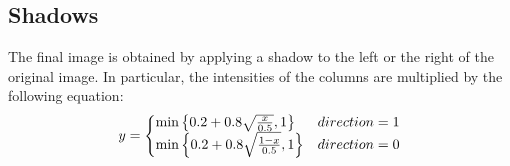 \subsection{Shadows}
The final image is obtained by applying a shadow  to the left or the right of the original image. In particular, the intensities of the columns are multiplied by the following equation:
\[
y =
\left\{
\begin{array}{
  @{}%
  l@{\quad}%
  r@{}%
  >{{}}r@{}%
  >{{}}l@{}%
}
  \text{min}\left\{0.2 + 0.8 \sqrt{\frac{x}{0.5}}, 1\right\}    &   direction = 1\\
  \text{min}\left\{0.2 + 0.8 \sqrt{\frac{1- x}{0.5}}, 1\right\}    &   direction = 0\\
\end{array}
\right.
\]